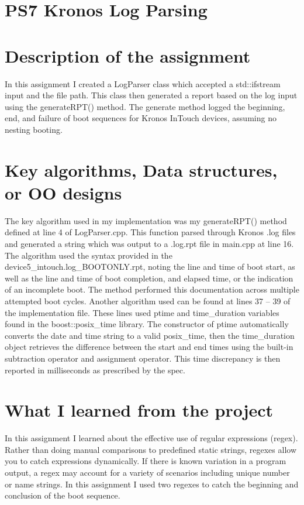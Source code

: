 \documentclass[12pt]{article}
\begin{document}
\section*{PS7 Kronos Log Parsing}
\section[1]{Description of the assignment}
\hfill\begin{minipage}{\dimexpr\textwidth-1cm}
In this assignment I created a LogParser class which accepted a std::ifstream input and the file path. This class then generated a report based on the log input using the generateRPT() method. The generate method logged the beginning, end, and failure of boot sequences for Kronos InTouch devices, assuming no nesting booting.
\end{minipage}

\section[2]{Key algorithms, Data structures, or OO designs}
\hfill\begin{minipage}{\dimexpr\textwidth-1cm}
The key algorithm used in my implementation was my generateRPT() method defined at line 4 of LogParser.cpp. This function parsed through Kronos .log files and generated a string which was output to a .log.rpt file in main.cpp at line 16. The algorithm used the syntax provided in the device5\_intouch.log\_BOOTONLY.rpt, noting the line and time of boot start, as well as the line and time of boot completion, and elapsed time, or the indication of an incomplete boot. The method performed this documentation across multiple attempted boot cycles. \newline
Another algorithm used can be found at lines 37 – 39 of the implementation file. These lines used ptime and time\_duration variables found in the boost::posix\_time library. The constructor of ptime automatically converts the date and time string to a valid posix\_time, then the time\_duration object retrieves the difference between the start and end times using the built-in subtraction operator and assignment operator. This time discrepancy is then reported in milliseconds as prescribed by the spec.

\end{minipage}

\section[3]{What I learned from the project}
\hfill\begin{minipage}{\dimexpr\textwidth-1cm}
In this assignment I learned about the effective use of regular expressions (regex). Rather than doing manual comparisons to predefined static strings, regexes allow you to catch expressions dynamically. If there is known variation in a program output, a regex may account for a variety of scenarios including unique number or name strings. In this assignment I used two regexes to catch the beginning and conclusion of the boot sequence.
\end{minipage}
\end{document}
